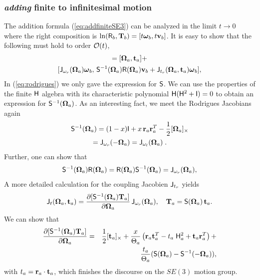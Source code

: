 \documentclass[conference]{IEEEtran}
\newcommand{\bfomega}{\boldsymbol{\omega}}
\newcommand{\bfOmega}{\boldsymbol{\Omega}}
\newcommand{\beq}{\begin{equation}}
\newcommand{\eeq}{\end{equation}}
\newcommand{\beqar}{\begin{eqnarray}}
\newcommand{\eeqar}{\end{eqnarray}}
\begin{document}
\begin{appendix}
\subsubsection{{\em adding} finite to infinitesimal motion}
The addition formula (\ref{eq:addfiniteSE3}) can be analyzed in the limit $t\rightarrow 0$ where the right composition is $\ln ({\sf R}_b,{\bf T}_b) = [t \bfomega_b, t {\bf v}_b]$. It is easy to show that the following must hold to order ${\cal O}(t)$,
\begin{multline}
    [\bfOmega_c,{\bf t}_c] = [\bfOmega_a,{\bf t}_a] + \\
    [{\sf J}_{\omega_r}(\bfOmega_a)\bfomega_b,\, 
    {\sf S}^{-1}(\bfOmega_a){\sf R}(\bfOmega_a){\bf v}_b + {\sf J}_{t_r}(\bfOmega_a,{\bf t}_a)\bfomega_b],
    \label{eq:SE3vectoraddition}
\end{multline}
In (\ref{eq:rodrigues}) we only gave the expression for ${\sf S}$. We can use the
properties of the finite ${\sf H}$ algebra with its characteristic polynomial ${\sf H}({\sf H}^2+{\sf I})=0$
to obtain an expression for ${\sf S}^{-1}(\bfOmega_a)$. As an interesting fact, we meet the Rodrigues Jacobians again
\begin{multline}
    {\sf S}^{-1}(\bfOmega_a) = (1-x){\sf I} + x\, {\bf r}_a{\bf r}_a^T - {1\over 2}[\bfOmega_a]_\times \\
    = {\sf J}_{\omega_r}(-\bfOmega_a) = {\sf J}_{\omega_l}(\bfOmega_a)\;.
\end{multline}
Further, one can show that
\beq
    {\sf S}^{-1}(\bfOmega_a){\sf R}(\bfOmega_a) = {\sf R}(\bfOmega_a){\sf S}^{-1}(\bfOmega_a) =
    {\sf J}_{\omega_r}(\bfOmega_a),
\eeq
A more detailed calculation for the coupling Jacobien ${\sf J}_{t_r}$ yields
\beq
    {\sf J}_{t}(\bfOmega_a,{\bf t}_a) = {\partial [{\sf S}^{-1}(\bfOmega_a){\bf T}_a] \over
    \partial \bfOmega_a} \, {\sf J}_{\omega_r}(\bfOmega_a),\quad {\bf T}_a = {\sf S}(\bfOmega_a) \, {\bf t}_a.
\eeq
We can show that
\beqar
    {\partial [{\sf S}^{-1}(\bfOmega_a){\bf T}_a] \over
    \partial \bfOmega_a} & = &
    {1\over 2}[{\bf t}_a]_\times+ {x\over\Theta_a}
    \left( {\bf r}_a{\bf t}_a^T- t_a \;{\sf H}^2_a + {\bf t}_a{\bf r}_a^T \right) + \nonumber \\
    && {t_a\over\Theta_a} ({\sf S}(\bfOmega_a)-{\sf S}^{-1}(-\bfOmega_a)),
\eeqar
with $ t_a = {\bf r}_a\cdot{\bf t}_a$, which finishes the discourse on the $SE(3)$ motion group.


\end{appendix}
\end{document}
